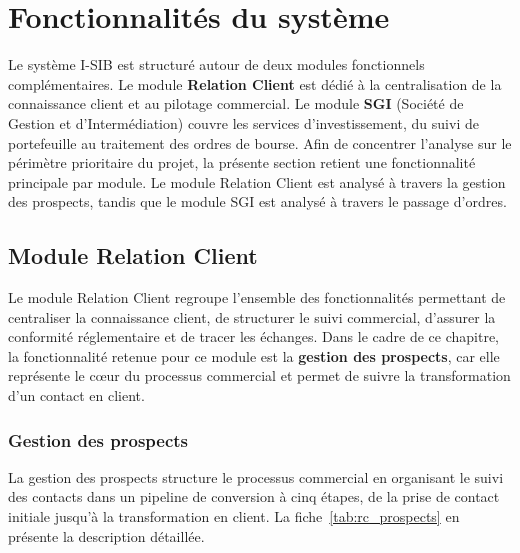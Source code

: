 \documentclass[a4paper,12pt]{report}
\begin{document}
\section{Fonctionnalités du système}

Le système I-SIB est structuré autour de deux modules fonctionnels complémentaires. Le
module \textbf{Relation Client} est dédié à la centralisation de la connaissance client et
au pilotage commercial. Le module \textbf{SGI} (Société de Gestion et d'Intermédiation)
couvre les services d'investissement, du suivi de portefeuille au traitement des ordres de
bourse. Afin de concentrer l'analyse sur le périmètre prioritaire du projet, la présente
section retient une fonctionnalité principale par module. Le module Relation Client est
analysé à travers la gestion des prospects, tandis que le module SGI est analysé à travers
le passage d'ordres.

\subsection{Module Relation Client}

Le module Relation Client regroupe l'ensemble des fonctionnalités permettant de centraliser
la connaissance client, de structurer le suivi commercial, d'assurer la conformité
réglementaire et de tracer les échanges. Dans le cadre de ce chapitre, la fonctionnalité
retenue pour ce module est la \textbf{gestion des prospects}, car elle représente le cœur
du processus commercial et permet de suivre la transformation d'un contact en client.

\subsubsection{Gestion des prospects}

La gestion des prospects structure le processus commercial en organisant le suivi des
contacts dans un pipeline de conversion à cinq étapes, de la prise de contact initiale
jusqu'à la transformation en client. La fiche~\ref{tab:rc_prospects} en présente la
description détaillée.
\end{document}
